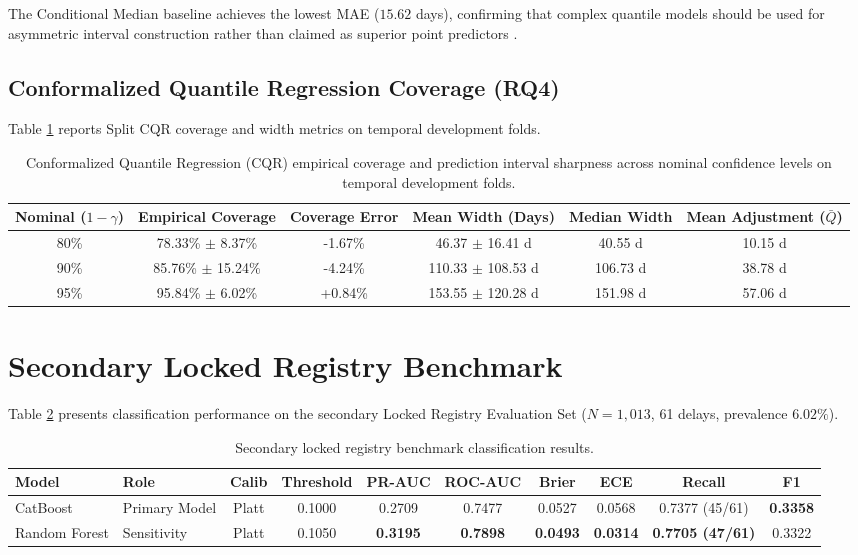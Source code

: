 \documentclass[11pt,a4paper]{article}
\begin{document}
The Conditional Median baseline achieves the lowest MAE ($15.62$ days), confirming that complex quantile models should be used for asymmetric interval construction rather than claimed as superior point predictors \cite{simchilevi2014superstorms}.

\subsection{Conformalized Quantile Regression Coverage (RQ4)}
Table \ref{tab:cqr_benchmark} reports Split CQR coverage and width metrics on temporal development folds.

\begin{table}[htbp]
\centering
\caption{Conformalized Quantile Regression (CQR) empirical coverage and prediction interval sharpness across nominal confidence levels on temporal development folds.}
\label{tab:cqr_benchmark}
\small
\begin{tabular}{cccccc}
\toprule
\textbf{Nominal ($1-\gamma$)} & \textbf{Empirical Coverage} & \textbf{Coverage Error} & \textbf{Mean Width (Days)} & \textbf{Median Width} & \textbf{Mean Adjustment ($\bar{Q}$)} \\
\midrule
80\% & 78.33\% $\pm$ 8.37\% & -1.67\% & 46.37 $\pm$ 16.41 d & 40.55 d & 10.15 d \\
90\% & 85.76\% $\pm$ 15.24\% & -4.24\% & 110.33 $\pm$ 108.53 d & 106.73 d & 38.78 d \\
95\% & 95.84\% $\pm$ 6.02\% & +0.84\% & 153.55 $\pm$ 120.28 d & 151.98 d & 57.06 d \\
\bottomrule
\end{tabular}
\end{table}

\section{Secondary Locked Registry Benchmark}
Table \ref{tab:locked_benchmark} presents classification performance on the secondary Locked Registry Evaluation Set ($N = 1,013$, 61 delays, prevalence $6.02\%$).

\begin{table}[htbp]
\centering
\caption{Secondary locked registry benchmark classification results.}
\label{tab:locked_benchmark}
\small
\begin{tabular}{llcccccccc}
\toprule
\textbf{Model} & \textbf{Role} & \textbf{Calib} & \textbf{Threshold} & \textbf{PR-AUC} & \textbf{ROC-AUC} & \textbf{Brier} & \textbf{ECE} & \textbf{Recall} & \textbf{F1} \\
\midrule
CatBoost & Primary Model & Platt & 0.1000 & 0.2709 & 0.7477 & 0.0527 & 0.0568 & 0.7377 (45/61) & \textbf{0.3358} \\
Random Forest & Sensitivity & Platt & 0.1050 & \textbf{0.3195} & \textbf{0.7898} & \textbf{0.0493} & \textbf{0.0314} & \textbf{0.7705 (47/61)} & 0.3322 \\
\bottomrule
\end{tabular}
\end{table}
\end{document}
